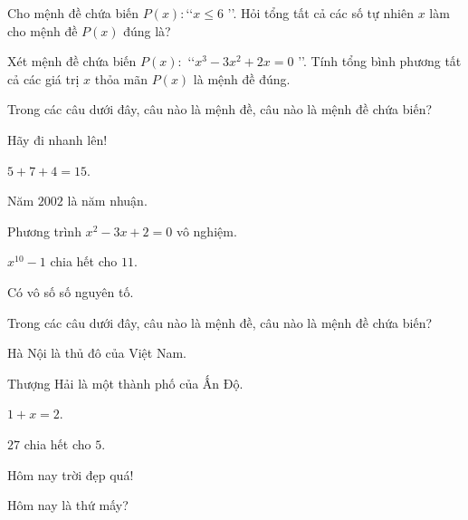 
\begin{bt}%
	Cho mệnh đề chứa biến $P(x)\colon $\lq\lq $ x \leq 6 $ \rq\rq. Hỏi tổng tất cả các số  tự nhiên $x$ làm cho mệnh đề $P(x)$ đúng là?
\end{bt}

\begin{bt}%
	Xét mệnh đề chứa biến $P(x)\colon$ \lq\lq $x^3-3 x^2+2 x=0$ \rq\rq. Tính tổng bình phương tất cả các giá trị $ x $ thỏa mãn $ P(x) $ là mệnh đề  đúng.
\end{bt}



\begin{bt}%
	Trong các câu  dưới đây, câu nào là mệnh đề, câu nào là mệnh đề chứa biến?
	\begin{listEX}[1]
		\item Hãy  đi nhanh lên!
		 \item $5+7+4=15$.
		\item Năm $2002$ là năm nhuận. 
		\item Phương trình  $x^2-3x+2=0$ vô nghiệm.
		 \item $x^{10}-1$ chia hết cho $11$.
		\item Có vô số  số nguyên tố.
	\end{listEX}
\end{bt}

\begin{bt}%
	Trong các câu dưới đây, câu nào  là mệnh đề, câu nào là mệnh đề chứa biến?
	\begin{listEX}[1]
		\item Hà Nội là thủ đô của  Việt Nam.
		\item  Thượng Hải là một thành phố của Ấn Độ.
		 \item $1+x=2$.
		\item $27$ chia hết  cho $5$.
		\item  Hôm nay trời đẹp quá!
		\item Hôm nay là thứ mấy? 
	\end{listEX}
\end{bt}

